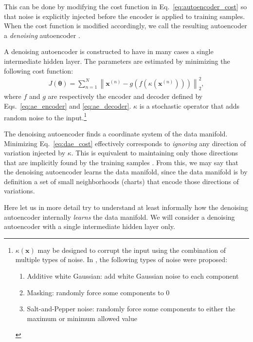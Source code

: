 \documentclass[dissertation,nocontribution]{aaltoseries}
\newcommand{\vect}[1]{\mathbf{#1}}
\newcommand{\vects}[1]{\boldsymbol{#1}}
\newcommand{\vx}[0]{\vect{x}}
\newcommand{\TT}[0]{{\vects{\theta}}}
\begin{document}
This can be done 
by modifying the cost
function in Eq.~\eqref{eq:autoencoder_cost} so that noise is
explicitly injected before the encoder is applied to
training samples.  When the cost function is modified
accordingly, we call the resulting autoencoder a
\textit{denoising} autoencoder \citep{Vincent2010}. 

A denoising autoencoder is constructed to have in many
cases a single intermediate hidden layer. The parameters
are estimated by minimizing the following cost function:
\begin{align}
    \label{eq:dae_cost}
    J(\TT) =  \sum_{n=1}^N \left\| \vx^{(n)} -
    g\left(f(\kappa(\vx^{(n)}))\right)
    \right\|_2^2,
\end{align}
where $f$ and $g$ are respectively the encoder and decoder
defined by Eqs.~\eqref{eq:ae_encoder} and
\eqref{eq:ae_decoder}.  $\kappa$ is a stochastic operator
that adds 
random noise to the input.\footnote{
$\kappa(\vx)$ may be designed to corrupt the input using the
combination of multiple types of noise. In
\citep{Vincent2010}, the following types of noise were
proposed:
\begin{enumerate}
        \vspace{-5mm}
    \itemsep 0em
    \item Additive white Gaussian: add white Gaussian noise
        to each component
    \item Masking: randomly force some components to $0$
    \item Salt-and-Pepper noise: randomly force some
        components to either the maximum or minimum allowed
        value
\end{enumerate}
}

The denoising autoencoder finds a coordinate system of the
data manifold.
Minimizing Eq.~\eqref{eq:dae_cost} effectively corresponds
to \textit{ignoring} any direction of variation injected by
$\kappa$. This is equivalent to maintaining only those
directions that are implicitly found by the training samples
\citep{Vincent2010}. From this, we may say that the
denoising autoencoder learns the data manifold, since the
data manifold is by definition a set of small
neighborhoods (charts) that encode those directions of
variations.

Here let us in more detail try to understand at least
informally how the denoising autoencoder internally
\textit{learns} the data manifold. We will consider a
denoising autoencoder with a single intermediate hidden
layer only.
\end{document}
